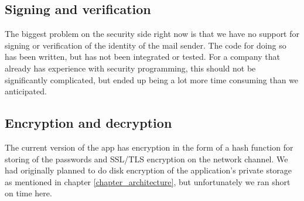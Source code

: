 \subsection{Signing and verification}
The biggest problem on the security side right now is that we have no support for signing or verification of the identity of the mail sender. The code for doing so has been written, but has not been integrated or tested. For a company that already has experience with security programming, this should not be significantly complicated, but ended up being a lot more time consuming than we anticipated.

\subsection{Encryption and decryption}
The current version of the app has encryption in the form of a hash function for storing of the passwords and SSL/TLS encryption on the network channel. We had originally planned to do disk encryption of the application's private storage as mentioned in chapter \ref{chapter_architecture}, but unfortunately we ran short on time here. 